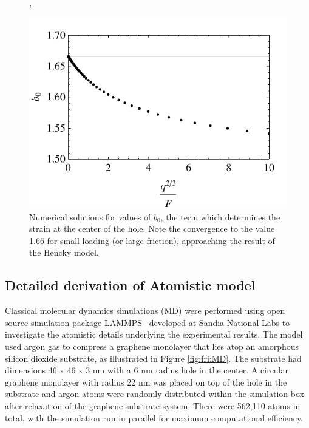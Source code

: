 \begin{figure}, 
	\begin{center}
	\includegraphics{Figs_Friction/b0.pdf}
	\end{center}
	\caption[Numerical solutions for values of $b_0$, the term which determines the strain at the center of the hole]{\label{fig:fri:b0} Numerical solutions for values of $b_0$, the term which determines the strain at the center of the hole. Note the convergence to the value 1.66 for small loading (or large friction), approaching the result of the Hencky model.}
\end{figure}

\subsection{Detailed derivation of Atomistic model}
Classical molecular dynamics simulations (MD) were performed using open source simulation package LAMMPS~\cite{plimptonLAMMPS,PlimptonJCP1995} developed at Sandia National Labs to investigate the atomistic details underlying the experimental results.
The model used argon gas to compress a graphene monolayer that lies atop an amorphous silicon dioxide substrate, as illustrated in Figure \ref{fig:fri:MD}.
The substrate had dimensions 46 x 46 x 3 nm with a 6 nm radius hole in the center.
A circular graphene monolayer with radius 22 nm was placed on top of the hole in the substrate and argon atoms were randomly distributed within the simulation box after relaxation of the graphene-substrate system.
There were 562,110 atoms in total, with the simulation run in parallel for maximum computational efficiency.

